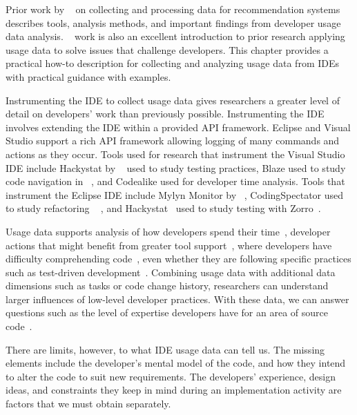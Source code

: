 \documentclass{book}
\begin{document}
Prior work by ~ on collecting and processing data for recommendation systems describes tools, analysis methods, and important findings from developer usage data analysis.  ~ work is also an excellent introduction to prior research applying usage data to solve issues that challenge developers.  This chapter provides a practical how-to description for collecting and analyzing usage data from IDEs with practical guidance with examples.  

Instrumenting the IDE to collect usage data gives researchers a greater level of detail on developers' work than previously possible. Instrumenting the IDE involves extending the IDE within a provided API framework.  Eclipse and Visual Studio support a rich API framework allowing logging of many commands and actions  as they occur.  Tools used for research that instrument the Visual Studio IDE include Hackystat by ~ used to study testing practices, Blaze used to study code navigation in  ~\cite {SnipesExperiencesGamifyingSoftwareDevelopment}, and Codealike used for developer time analysis.  Tools that instrument the Eclipse IDE include Mylyn Monitor by ~, CodingSpectator used to study refactoring ~\cite{VakilianETAL2012UseDisuseMisuse} , and Hackystat~\cite{V:johnson2003beyond} used to study testing with Zorro~\cite{Kou2010Operational}.

Usage data supports analysis of how developers spend their time~\cite{V:johnson2003beyond}, developer actions that might benefit from greater tool support~\cite{V:MurphyHill2012How}, where developers have difficulty comprehending code~\cite{Carter2010Are}, even whether they are following specific practices such as test-driven development~\cite{Kou2010Operational}.  Combining usage data with additional data dimensions such as tasks or code change history, researchers can understand larger influences of low-level developer practices.  With these data, we can answer questions such as the level of expertise developers have for an area of source code~\cite{Fritz2010Degreeofknowledge}.

There are limits, however, to what IDE usage data can tell us.  The missing elements include the developer's mental model of the code, and how they intend to alter the code to suit new requirements.  The developers' experience, design ideas, and constraints they keep in mind during an implementation activity are factors that we must obtain separately.  
\end{document}
